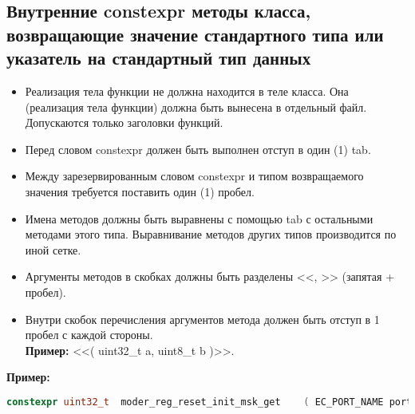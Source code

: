 \subsection{Внутренние constexpr методы класса, возвращающие значение стандартного типа или указатель на стандартный тип данных}\label{zp:constexpr:s}
\begin{itemize}
	\item Реализация тела функции не должна находится в теле класса. Она (реализация тела функции) должна быть вынесена в отдельный файл. Допускаются только заголовки функций.
	\item Перед словом constexpr должен быть выполнен отступ в один (1) tab.
	\item Между зарезервированным словом constexpr и типом возвращаемого значения требуется поставить один (1) пробел.
	\item Имена методов должны быть выравнены с помощью tab с остальными методами этого типа. Выравнивание методов других типов производится по иной сетке.
	\item Аргументы методов в скобках должны быть разделены <<, >> (запятая + пробел).
	\item Внутри скобок перечисления аргументов метода должен быть отступ в 1 пробел с каждой стороны.\\\textbf{Пример: } <<( uint32\_t a, uint8\_t b )>>.
\end{itemize}
\textbf{Пример:}\begin{lstlisting}[language=C++, frame=tlBR, basicstyle=\fontsize{10}{10}\ttfamily]
	constexpr uint32_t	moder_reg_reset_init_msk_get	( EC_PORT_NAME port_name );
\end{lstlisting}

